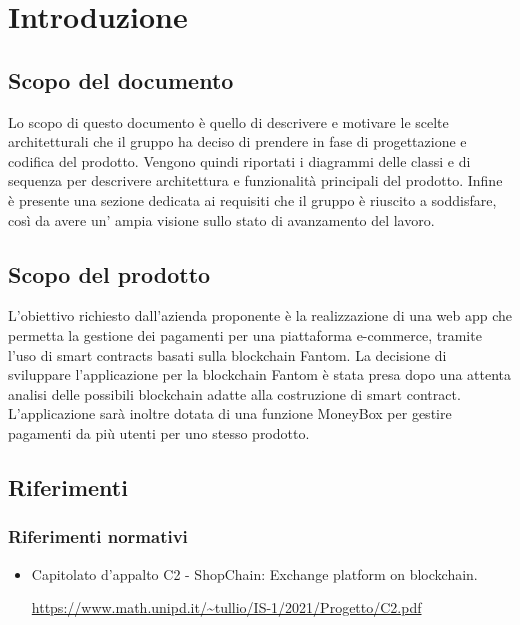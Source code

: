 \section{Introduzione}\label{section:introduzione}
\subsection{Scopo del documento}
Lo scopo di questo documento è quello di descrivere e motivare le scelte architetturali che il gruppo \groupName{} ha deciso di prendere in fase di progettazione e codifica del prodotto.
Vengono quindi riportati i diagrammi delle classi e di sequenza per descrivere architettura e funzionalità principali del prodotto. Infine è presente una sezione dedicata ai requisiti che il gruppo \groupName{} è riuscito a soddisfare, così da avere un' ampia visione sullo stato di avanzamento del lavoro.
\subsection{Scopo del prodotto}
L'obiettivo richiesto dall'azienda proponente è la realizzazione di una web app\glo{} che permetta la gestione dei pagamenti per una piattaforma e-commerce\glo{}, tramite l'uso di smart contracts\glo{} basati sulla blockchain\glo{} Fantom\glo{}.
La decisione di sviluppare l'applicazione per la blockchain\glo{} Fantom\glo{} è stata presa dopo una attenta analisi delle possibili blockchain\glo{} adatte alla costruzione di smart contract\glo{}.
L'applicazione sarà inoltre dotata di una funzione MoneyBox\glo{} per gestire pagamenti da più utenti per uno stesso prodotto.

\subsection{Riferimenti}
\subsubsection{Riferimenti normativi}
\begin{itemize}
    \item Capitolato d'appalto C2 - ShopChain: Exchange platform on blockchain.
    \begin{center}
        \url{https://www.math.unipd.it/~tullio/IS-1/2021/Progetto/C2.pdf}
    \end{center}
    \end{itemize} 
